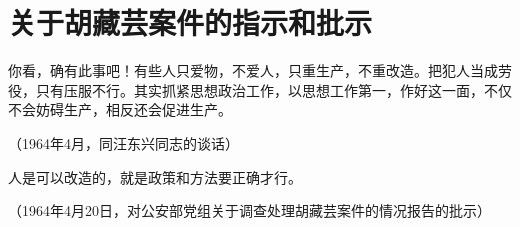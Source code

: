 \section[关于胡藏芸案件的指示和批示（一九六四年四月）]{关于胡藏芸案件的指示和批示}


你看，确有此事吧！有些人只爱物，不爱人，只重生产，不重改造。把犯人当成劳役，只有压服不行。其实抓紧思想政治工作，以思想工作第一，作好这一面，不仅不会妨碍生产，相反还会促进生产。

{\raggedleft （1964年4月，同汪东兴同志的谈话）\par}

人是可以改造的，就是政策和方法要正确才行。

{\raggedleft （1964年4月20日，对公安部党组关于调查处理胡藏芸案件的情况报告的批示）\par}


